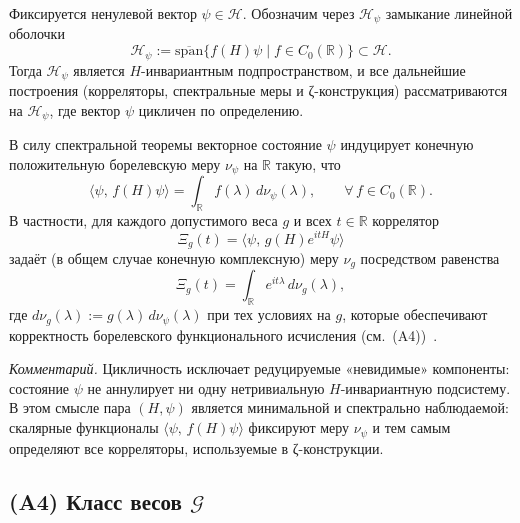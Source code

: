 \documentclass{article}
\numberwithin{equation}{section}
\theoremstyle{plain}
\theoremstyle{definition}
\theoremstyle{remark}
\begin{document}
\noindent
Фиксируется ненулевой вектор $\psi\in\mathcal H$.
Обозначим через $\mathcal H_\psi$ замыкание линейной оболочки
\begin{equation}
\mathcal H_\psi
:=\overline{\mathrm{span}}\{f(H)\psi \mid f\in C_0(\mathbb R)\}\subset \mathcal H.
\end{equation}
Тогда $\mathcal H_\psi$ является $H$-инвариантным подпространством, и все дальнейшие построения
(корреляторы, спектральные меры и ζ-конструкция) рассматриваются на $\mathcal H_\psi$,
где вектор $\psi$ цикличен по определению.

В силу спектральной теоремы векторное состояние $\psi$ индуцирует конечную положительную
борелевскую меру $\nu_\psi$ на $\mathbb R$ такую, что
\begin{equation}
\langle\psi,\,f(H)\psi\rangle=\int_{\mathbb R} f(\lambda)\,d\nu_\psi(\lambda),
\qquad \forall\,f\in C_0(\mathbb R).
\end{equation}
В частности, для каждого допустимого веса $g$ и всех $t\in\mathbb R$ коррелятор
\begin{equation}
\Xi_g(t)=\langle\psi,\,g(H)e^{itH}\psi\rangle
\end{equation}
задаёт (в общем случае конечную комплексную) меру $\nu_g$ посредством равенства
\begin{equation}
\Xi_g(t)=\int_{\mathbb R} e^{it\lambda}\,d\nu_g(\lambda),
\end{equation}
где $d\nu_g(\lambda):=g(\lambda)\,d\nu_\psi(\lambda)$ при тех условиях на $g$,
которые обеспечивают корректность борелевского функционального исчисления
(см.~(A4))~\cite{Dixmier1981}.

\emph{Комментарий.}
Цикличность исключает редуцируемые «невидимые» компоненты: состояние $\psi$
не аннулирует ни одну нетривиальную $H$-инвариантную подсистему.
В этом смысле пара $(H,\psi)$ является минимальной и спектрально наблюдаемой:
скалярные функционалы $\langle\psi,\,f(H)\psi\rangle$ фиксируют меру $\nu_\psi$
и тем самым определяют все корреляторы, используемые в ζ-конструкции.


\subsection{(A4) Класс весов $\mathcal G$}
\label{subsec:weights}
\end{document}
